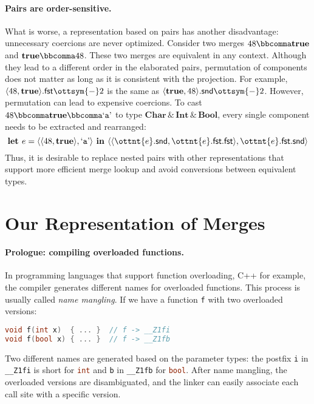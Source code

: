 \paragraph{Pairs are order-sensitive.}
What is worse, a representation based on pairs has another disadvantage:
unnecessary coercions are never optimized. Consider two merges $48  \bbcomma   \mathbf{true} $
and $ \mathbf{true}   \bbcomma  48$. These two merges are equivalent in any context. Although
they lead to a different order in the elaborated pairs, permutation of
components does not matter as long as it is consistent with the projection. For
example, $  \langle  48 ,   \mathbf{true}   \rangle   . \mathsf{fst}   \ottsym{-}  2$ is the same as $  \langle   \mathbf{true}  ,  48  \rangle   . \mathsf{snd}   \ottsym{-}  2$. However,
permutation can lead to expensive coercions. To cast $48  \bbcomma   \mathbf{true}   \bbcomma   \text{`\texttt{a}'} $ to type
$ \mathbf{Char}   \, {\&} \,   \mathbf{Int}   \, {\&} \,   \mathbf{Bool} $, every single component needs to be extracted and
rearranged:
\[
\textbf{let } e =  \langle   \langle  48 ,   \mathbf{true}   \rangle  ,   \text{`\texttt{a}'}   \rangle  \textbf{ in }
 \langle   \langle   \ottnt{e}  . \mathsf{snd}  ,    \ottnt{e}  . \mathsf{fst}   . \mathsf{fst}   \rangle  ,    \ottnt{e}  . \mathsf{fst}   . \mathsf{snd}   \rangle 
\]
Thus, it is desirable to replace nested pairs with other representations that
support more efficient merge lookup and avoid conversions between equivalent
types.

\section{Our Representation of Merges}

\paragraph{Prologue: compiling overloaded functions.}
In programming languages that support function overloading, C++ for example, the
compiler generates different names for overloaded functions. This process is
usually called \emph{name mangling}. If we have a function \lstinline{f} with
two overloaded versions:
\begin{lstlisting}[language=C++]
void f(int x)  { ... }  // f -> __Z1fi
void f(bool x) { ... }  // f -> __Z1fb
\end{lstlisting}
Two different names are generated based on the parameter types: the postfix
\lstinline{i} in \lstinline{__Z1fi} is short for \lstinline[language=C++]{int}
and \lstinline{b} in \lstinline{__Z1fb} for \lstinline[language=C++]{bool}.
After name mangling, the overloaded versions are disambiguated, and the linker
can easily associate each call site with a specific version.

